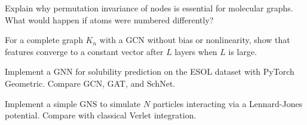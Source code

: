 \begin{exercise}
Explain why permutation invariance of nodes is essential for
molecular graphs. What would happen if atoms were numbered
differently?
\end{exercise}

\begin{exercise}
For a complete graph $K_n$ with a GCN without bias or nonlinearity,
show that features converge to a constant vector after $L$ layers
when $L$ is large.
\end{exercise}

\begin{exercise}[Implementation]
Implement a GNN for solubility prediction on the ESOL dataset
with PyTorch Geometric. Compare GCN, GAT, and SchNet.
\end{exercise}

\begin{exercise}[Simulation]
Implement a simple GNS to simulate $N$ particles interacting via a
Lennard-Jones potential. Compare with classical Verlet integration.
\end{exercise}
